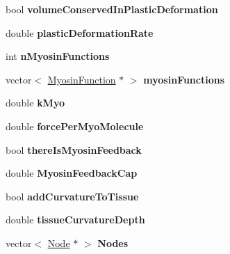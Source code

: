 \begin{DoxyCompactItemize}
\item 
\hypertarget{classSimulation_a0e44e881245a507dc96188a8934b3bcc}{}bool {\bfseries volume\+Conserved\+In\+Plastic\+Deformation}\label{classSimulation_a0e44e881245a507dc96188a8934b3bcc}

\item 
\hypertarget{classSimulation_a681f9a84f87de75e7cdb951a89ec54fc}{}double {\bfseries plastic\+Deformation\+Rate}\label{classSimulation_a681f9a84f87de75e7cdb951a89ec54fc}

\item 
\hypertarget{classSimulation_a99cf859f33b779f43f46e23df7227803}{}int {\bfseries n\+Myosin\+Functions}\label{classSimulation_a99cf859f33b779f43f46e23df7227803}

\item 
\hypertarget{classSimulation_aa662969fe152e645993a23834a4e6920}{}vector$<$ \hyperlink{classMyosinFunction}{Myosin\+Function} $\ast$ $>$ {\bfseries myosin\+Functions}\label{classSimulation_aa662969fe152e645993a23834a4e6920}

\item 
\hypertarget{classSimulation_a3f011f0be023bdb2dcf0e7535dc88789}{}double {\bfseries k\+Myo}\label{classSimulation_a3f011f0be023bdb2dcf0e7535dc88789}

\item 
\hypertarget{classSimulation_a7ed80530f06f7579e8bf3f4f24f685b6}{}double {\bfseries force\+Per\+Myo\+Molecule}\label{classSimulation_a7ed80530f06f7579e8bf3f4f24f685b6}

\item 
\hypertarget{classSimulation_a6a108c1bae9f479316ab41dd227107af}{}bool {\bfseries there\+Is\+Myosin\+Feedback}\label{classSimulation_a6a108c1bae9f479316ab41dd227107af}

\item 
\hypertarget{classSimulation_ae9d6b9bc095b2ebaa9ba194edd74582a}{}double {\bfseries Myosin\+Feedback\+Cap}\label{classSimulation_ae9d6b9bc095b2ebaa9ba194edd74582a}

\item 
\hypertarget{classSimulation_a11acf13f9f67a78b577e8350e75c0cad}{}bool {\bfseries add\+Curvature\+To\+Tissue}\label{classSimulation_a11acf13f9f67a78b577e8350e75c0cad}

\item 
\hypertarget{classSimulation_ac9fb8502871923725b5607487ce69108}{}double {\bfseries tissue\+Curvature\+Depth}\label{classSimulation_ac9fb8502871923725b5607487ce69108}

\item 
\hypertarget{classSimulation_a51e3f02b266fd5156a1d78054f1dac37}{}vector$<$ \hyperlink{classNode}{Node} $\ast$ $>$ {\bfseries Nodes}\label{classSimulation_a51e3f02b266fd5156a1d78054f1dac37}


\end{DoxyCompactItemize}
